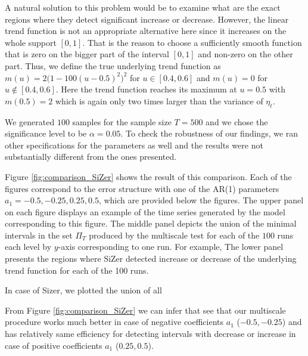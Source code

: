 \documentclass[a4paper,12pt]{article}
\begin{document}
A natural solution to this problem would be to examine what are the exact regions where they detect significant increase or decrease. However, the linear trend function is not an appropriate alternative here since it increases on the whole support $[0, 1]$. That is the reason to choose a sufficiently smooth function that is zero on the bigger part of the interval $[0, 1]$ and non-zero on the other part. Thus, we define the true underlying trend function as $m(u) = 2\big(1 - 100(u - 0.5)^2\big)^2$ for $u \in [0.4, 0.6]$ and $m(u) = 0$ for $u \notin [0.4, 0.6]$. Here the trend function reaches its maximum at $u = 0.5$ with $m(0.5) = 2$ which is again only two times larger than the variance of $\eta_t$.

We generated $100$ samples for the sample size $T = 500$ and we chose the significance level to be $\alpha = 0.05$. To check the robustness of our findings, we ran other specifications for the parameters as well and the results were not substantially different from the ones presented.

Figure \ref{fig:comparison_SiZer} shows the result of this comparison. Each of the figures correspond to the error structure with one of the AR(1) parameters $a_1 = -0.5, -0.25, 0.25, 0.5$, which are provided below the figures. The upper panel on each figure displays an example of the time series generated by the model corresponding to this figure. The middle panel depicts the union of the minimal intervals in the set $\Pi_T$ produced by the multiscale test for each of the $100$ runs each level by $y$-axis corresponding to one run. For example,  The lower panel presents the regions where SiZer detected increase or decrease of the underlying trend function for each of the 100 runs.

In case of Sizer, we plotted the union of all      

From Figure \ref{fig:comparison_SiZer} we can infer that see that our multiscale procedure works much better in case of negative coefficients $a_1$ ($-0.5, -0.25$) and has relatively same efficiency for detecting intervals with decrease or increase in case of positive coefficients $a_1$ ($0.25, 0.5$).
\end{document}
